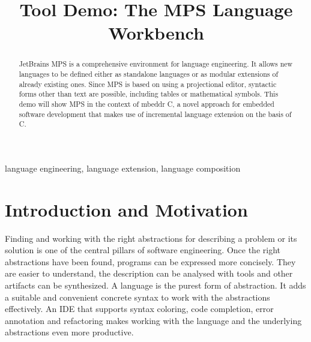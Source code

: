 \documentclass[10pt, conference, compsocconf]{IEEEtran}
\begin{document}
%
\title{Tool Demo: The MPS Language Workbench}

 

\author{
\and
{}
}

\newcommand{\changefont}[3]{\fontfamily{#1}\fontseries{#2}\fontshape{#3}\selectfont}

\newcommand\todo[1]{\mynote{TODO}{#1}} 
\newcommand{\fig}[1]{Fig.~\ref{#1}}
\newcommand{\sect}[1]{Section~\ref{#1}}
\newcommand{\ic}[1]{\changefont{cmtt}{m}{n}{#1}\normalfont}  %
\newcommand{\lcr}[1]{\changefont{cmtt}{m}{n}{#1}\normalfont} %

\newcommand{\pp}[1]{ \vspace{2mm}\noindent\textbf{{#1}} }


\maketitle


\begin{abstract}
JetBrains MPS is a comprehensive environment for language engineering.
It allows new languages to be defined either as standalone languages or as modular extensions of
already existing ones. Since MPS is based on using a projectional editor, syntactic forms other
than text are possible, including tables or mathematical symbols. This
demo will show MPS in the context of mbeddr C, a novel approach for embedded software
development that makes use of incremental language extension on the basis of C.
\end{abstract}

\begin{IEEEkeywords}
language engineering, language extension, language composition
\end{IEEEkeywords}

\section{Introduction and Motivation}

\noindent
Finding and working with the right abstractions for describing a
problem or its solution is one of the central pillars of software engineering. Once the right abstractions have been found, programs can be expressed more
concisely. They are easier to understand, the description can be analysed with tools and other
artifacts can be synthesized. A language is the purest form of abstraction.
It adds a suitable and convenient concrete syntax to work with the abstractions effectively. An
IDE that supports syntax coloring, code completion, error annotation and
refactoring makes working with the language and the underlying abstractions even more
productive.
\end{document}
